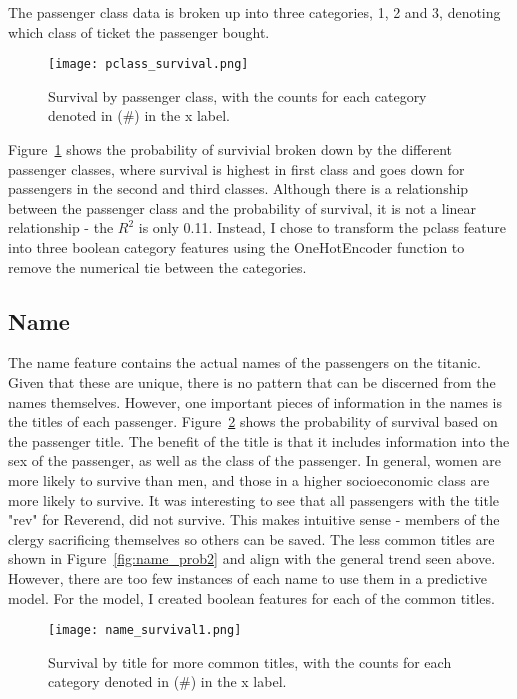 \documentclass[12pt, letterpaper]{article}
\begin{document}
The passenger class data is broken up into three categories, 1, 2 and 3, denoting which class of ticket the passenger bought. 

\begin{figure}[H]
    \centering
    \texttt{[image: pclass\_survival.png]}
    \caption{Survival by passenger class, with the counts for each category denoted in (\#) in the x label. }
    \label{fig:pclass_prob}
\end{figure}

Figure~\ref{fig:pclass_prob} shows the probability of survivial broken down by the different passenger classes, where survival is highest in first class and goes down for passengers in the second and third classes. Although there is a relationship between the passenger class and the probability of survival, it is not a linear relationship - the \(R^2\) is only 0.11. Instead, I chose to transform the pclass feature into three boolean category features using the OneHotEncoder function to remove the numerical tie between the categories. 

\subsection{Name}

The name feature contains the actual names of the passengers on the titanic. Given that these are unique, there is no pattern that can be discerned from the names themselves. However, one important pieces of information in the names is the titles of each passenger. Figure~\ref{fig:name_prob1} shows the probability of survival based on the passenger title. The benefit of the title is that it includes information into the sex of the passenger, as well as the class of the passenger. In general, women are more likely to survive than men, and those in a higher socioeconomic class are more likely to survive. It was interesting to see that all passengers with the title "rev" for Reverend, did not survive. This makes intuitive sense - members of the clergy sacrificing themselves so others can be saved. The less common titles are shown in Figure~\ref{fig:name_prob2} and align with the general trend seen above. However, there are too few instances of each name to use them in a predictive model. For the model, I created boolean features for each of the common titles. 

\begin{figure}[H]
    \centering
    \texttt{[image: name\_survival1.png]}
    \caption{Survival by title for more common titles, with the counts for each category denoted in (\#) in the x label. }
    \label{fig:name_prob1}
\end{figure}
\end{document}
